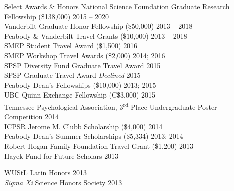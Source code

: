 \begin{rSection}{\textrm{Select Awards \& Honors}}
National Science Foundation Graduate Research Fellowship (\$138,000) 	\hfill{2015 – 2020}\\
Vanderbilt Graduate Honor Fellowship (\$50,000)				\hfill{2013 – 2018}\\	
Peabody \& Vanderbilt Travel Grants (\$10,000)				\hfill  {2013 – 2018}\\
SMEP Student Travel Award (\$1,500)						\hfill{2016}\\
SMEP Workshop Travel Awards (\$2,000)					\hfill{2014; 2016}\\
SPSP Diversity Fund Graduate Travel Award %
\hfill{2015}\\
SPSP Graduate Travel Award %
{\small \textit{Declined}} \hfill{2015}\\
Peabody Dean's Fellowships (\$10,000)					\hfill  {2013; 2015}\\
UBC Quinn Exchange Fellowship (C\$3,000) \hfill{2015}\\
Tennessee Psychological Association, 3\textsuperscript{rd} Place Undergraduate Poster Competition \hfill{2014}\\
ICPSR Jerome M. Clubb Scholarship (\$4,000) \hfill{2014}\\
Peabody Dean's Summer Scholarships (\$5,334)			    \hfill  {2013; 2014}\\	
Robert Hogan Family Foundation Travel Grant (\$1,200) 	\hfill  {2013}\\
Hayek Fund for Future Scholars                      \hfill{2013}\\
\begin{minipage}{\linewidth}
\vspace{1.1mm} WUStL Latin Honors \hfill{2013}\\
\textit{Sigma Xi} Science Honors Society   	\hfill  {2013}
\end{minipage}%
\end{rSection}

